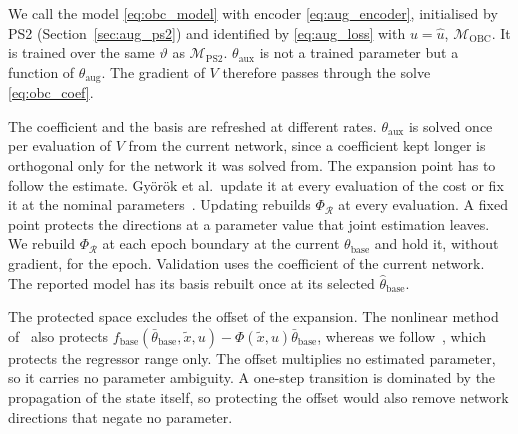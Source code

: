 We call the model \eqref{eq:obc_model} with encoder \eqref{eq:aug_encoder},
initialised by PS2 (Section~\ref{sec:aug_ps2}) and identified by
\eqref{eq:aug_loss} with $u=\hat u$, $\mathcal M_{\mathrm{OBC}}$.
It is trained over the same $\vartheta$ as $\mathcal M_{\mathrm{PS2}}$.
$\theta_{\mathrm{aux}}$ is not a trained parameter but a function of
$\theta_{\mathrm{aug}}$.
The gradient of $V$ therefore passes through the solve \eqref{eq:obc_coef}.

The coefficient and the basis are refreshed at different rates.
$\theta_{\mathrm{aux}}$ is solved once per evaluation of $V$ from the current
network, since a coefficient kept longer is orthogonal only for the network it
was solved from.
The expansion point has to follow the estimate.
Gy\"or\"ok et al.\ update it at every evaluation of the cost or fix it at the
nominal parameters~\cite[Sec.~4]{gyorok2025l4dc}.
Updating rebuilds $\Phi_{\mathcal R}$ at every evaluation.
A fixed point protects the directions at a parameter value that joint
estimation leaves.
We rebuild $\Phi_{\mathcal R}$ at each epoch boundary at the current
$\theta_{\mathrm{base}}$ and hold it, without gradient, for the epoch.
Validation uses the coefficient of the current network.
The reported model has its basis rebuilt once at its selected
$\hat\theta_{\mathrm{base}}$.

The protected space excludes the offset of the expansion.
The nonlinear method of~\cite[Eq.~(18)]{gyorok2025l4dc} also protects
$f_{\mathrm{base}}(\bar\theta_{\mathrm{base}},\tilde x,u)
-\Phi(\tilde x,u)\bar\theta_{\mathrm{base}}$, whereas we follow~\cite[Eq.~(8)]{gyorok2026obc},
which protects the regressor range only.
The offset multiplies no estimated parameter, so it carries no parameter
ambiguity.
A one-step transition is dominated by the propagation of the state itself, so
protecting the offset would also remove network directions that negate no
parameter.

